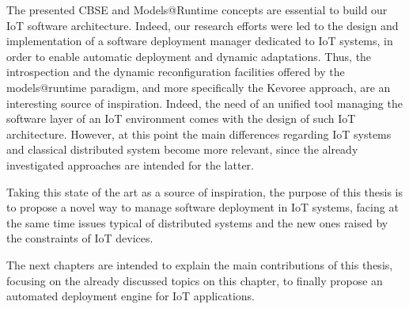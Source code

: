The presented CBSE and Models@Runtime concepts are essential to build our IoT software architecture.
Indeed, our research efforts were led to the design and implementation of a software deployment manager dedicated to IoT systems, in order to enable automatic deployment and dynamic adaptations.
Thus, the introspection and the dynamic reconfiguration facilities offered by the models@runtime paradigm, and more specifically the Kevoree approach, are an interesting source of inspiration.
Indeed, the need of an unified tool managing the software layer of an IoT environment comes with the design of such IoT architecture.
However, at this point the main differences regarding IoT systems and classical distributed system become more relevant, since the already investigated approaches are intended for the latter.

Taking this state of the art as a source of inspiration, the purpose of this thesis is to propose a novel way to manage software deployment in IoT systems, facing at the same time issues typical of distributed systems and the new ones raised by the constraints of IoT devices.

The next chapters are intended to explain the main contributions of this thesis, focusing on the already discussed topics on this chapter, to finally propose an automated deployment engine for IoT applications.
